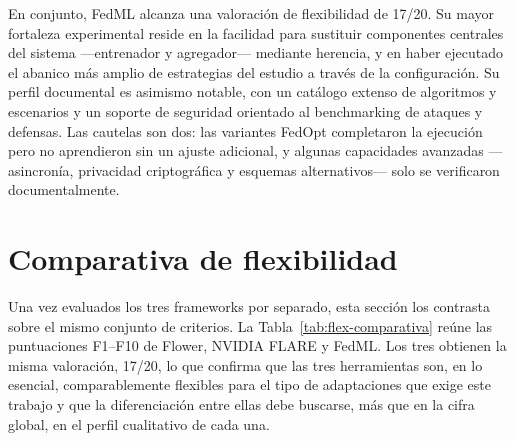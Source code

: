 En conjunto, FedML alcanza una valoración de flexibilidad de 17/20. Su mayor fortaleza
experimental reside en la facilidad para sustituir componentes centrales del sistema
—entrenador y agregador— mediante herencia, y en haber ejecutado el abanico más amplio
de estrategias del estudio a través de la configuración. Su perfil documental es
asimismo notable, con un catálogo extenso de algoritmos y escenarios y un soporte de
seguridad orientado al benchmarking de ataques y defensas. Las cautelas son dos: las
variantes FedOpt completaron la ejecución pero no aprendieron sin un ajuste
adicional, y algunas capacidades avanzadas —asincronía, privacidad criptográfica y
esquemas alternativos— solo se verificaron documentalmente.


\section{Comparativa de flexibilidad}\label{sec:flex-comparativa}

Una vez evaluados los tres frameworks por separado, esta sección los contrasta sobre
el mismo conjunto de criterios. La Tabla~\ref{tab:flex-comparativa} reúne las
puntuaciones F1--F10 de Flower, NVIDIA FLARE y FedML. Los tres obtienen la misma
valoración, 17/20, lo que confirma que las tres herramientas son, en lo esencial,
comparablemente flexibles para el tipo de adaptaciones que exige este trabajo y que la
diferenciación entre ellas debe buscarse, más que en la cifra global, en el perfil
cualitativo de cada una.

